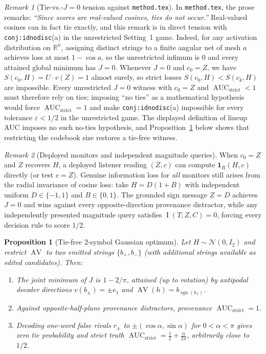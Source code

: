 \documentclass[11pt]{article}
\theoremstyle{plain}
\newtheorem{proposition}[theorem]{Proposition}
\theoremstyle{definition}
\theoremstyle{remark}
\newtheorem{remark}{Remark}
\DeclareMathOperator{\AUC}{AUC}
\DeclareMathOperator{\AV}{AV}
\DeclareMathOperator{\MI}{I}
\DeclareMathOperator{\sgn}{sgn}
\begin{document}
\begin{remark}[Tie-vs.-$J=0$ tension against \texttt{method.tex}]\label{rem:ties}
In \texttt{method.tex}, the prose remarks: \emph{``Since scores are real-valued cosines, ties do not occur.''} Real-valued cosines can in fact tie exactly, and this remark is in direct tension with \texttt{conj:idnodisc}(a) in the unrestricted Setting~1 game. Indeed, for any activation distribution on $\mathbb{R}^n$, assigning distinct strings to a finite angular net of mesh $a$ achieves loss at most $1 - \cos a$, so the unrestricted infimum is $0$ and every attained global minimum has $J = 0$. Whenever $J = 0$ and $c_0 = Z$, we have $S(c_0, H) = U \cdot v(Z) = 1$ almost surely, so strict losses $S(c_0, H) < S(c_k, H)$ are impossible. Every unrestricted $J = 0$ witness with $c_0 = Z$ and $\AUC_{\mathrm{strict}} < 1$ must therefore rely on ties; imposing ``no ties'' as a mathematical hypothesis would force $\AUC_{\mathrm{strict}} = 1$ and make \texttt{conj:idnodisc}(a) impossible for every tolerance $\varepsilon < 1/2$ in the unrestricted game. The displayed definition of lineup AUC imposes no such no-ties hypothesis, and Proposition~\ref{prop:gaussian} below shows that restricting the codebook size restores a tie-free witness.
\end{remark}

\begin{remark}[Deployed monitors and independent magnitude queries]
When $c_0 = Z$ and $Z$ recovers $H$, a deployed listener reading $(Z, c)$ can compute $\mathbf{1}_R(H, c)$ directly (or test $c = Z$). Genuine information loss for \emph{all} monitors still arises from the radial invariance of cosine loss: take $H = D(1 + B)$ with independent uniform $D \in \{-1, 1\}$ and $B \in \{0, 1\}$. The grounded sign message $Z = D$ achieves $J = 0$ and wins against every opposite-direction provenance distractor, while any independently presented magnitude query satisfies $\MI(T; Z, C) = 0$, forcing every decision rule to score $1/2$.
\end{remark}

\begin{proposition}[Tie-free 2-symbol Gaussian optimum]\label{prop:gaussian}
Let $H \sim \mathcal{N}(0, I_2)$ and restrict $\AV$ to two emitted strings $\{b_+, b_-\}$ (with additional strings available as edited candidates). Then:
\begin{enumerate}[label=\textup{(\arabic*)},leftmargin=2em,itemsep=2pt]
\item The joint minimum of $J$ is $1 - 2/\pi$, attained (up to rotation) by antipodal decoder directions $v(b_\pm) = \pm e_1$ and $\AV(h) = b_{\sgn(h_1)}$.
\item Against opposite-half-plane provenance distractors, provenance $\AUC_{\mathrm{strict}} = 1$.
\item Decoding one-word false rivals $r_\pm$ to $\pm(\cos\alpha, \sin\alpha)$ for $0 < \alpha < \pi$ gives zero tie probability and strict truth $\AUC_{\mathrm{strict}} = \frac{1}{2} + \frac{\alpha}{2\pi}$, arbitrarily close to $1/2$.
\end{enumerate}
\end{proposition}
\end{document}
